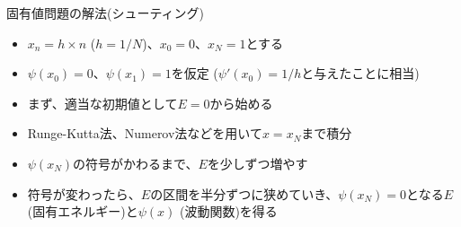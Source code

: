\begin{frame}[t,fragile]{固有値問題の解法(シューティング)}
  \begin{itemize}
  \item $x_n=h \times n$ ($h=1/N$)、$x_0=0$、$x_N=1$とする
  \item $\psi(x_0)=0$、$\psi(x_1) = 1$を仮定 ($\psi'(x_0)=1/h$と与えたことに相当)
  \item まず、適当な初期値として$E = 0$から始める
  \item Runge-Kutta法、Numerov法などを用いて$x=x_N$まで積分
  \item $\psi(x_N)$の符号がかわるまで、$E$を少しずつ増やす
  \item 符号が変わったら、$E$の区間を半分ずつに狭めていき、$\psi(x_N)=0$となる$E$ (固有エネルギー)と$\psi(x)$ (波動関数)を得る
  \end{itemize}
\end{frame}
